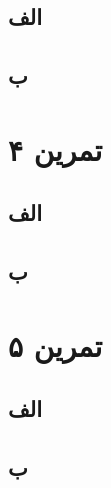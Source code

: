 \documentclass[]{article}
\begin{document}
\subsection*{\color{blue}{جواب}}
\subsection*{الف}

\subsection*{ب}



\pagebreak
\section*{تمرین ۴}

\subsection*{\color{blue}{جواب}}
\subsection*{الف}

\subsection*{ب}


\pagebreak
\section*{تمرین ۵}

\subsection*{\color{blue}{جواب}}
\subsection*{الف}

\subsection*{ب}

\end{document}
